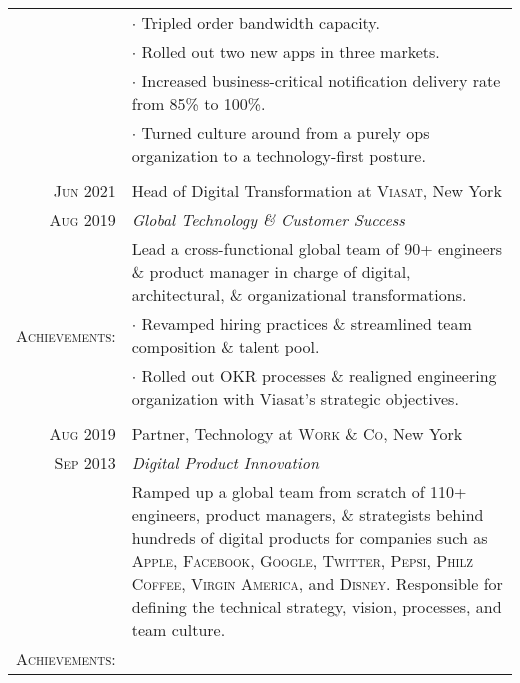 \documentclass[a4paper,10pt]{article}
\begin{document}
\begin{tabular}{r|p{13cm}}
  &$\cdot$ \footnotesize{Tripled order bandwidth capacity.}\\
  &$\cdot$ \footnotesize{Rolled out two new apps in three markets.}\\
  &$\cdot$ \footnotesize{Increased business-critical notification delivery rate from 85\% to 100\%.}\\
  &$\cdot$ \footnotesize{Turned culture around from a purely ops organization to a technology-first posture.}\\

  \multicolumn{2}{c}{}\\

  \textsc{Jun 2021} & Head of Digital Transformation at \textsc{Viasat}, New York \\

  \textsc{Aug 2019} & \emph{Global Technology \& Customer Success}\\

  &\footnotesize{Lead a cross-functional global team of 90+
    engineers \& product manager in charge of digital, architectural,
    \& organizational transformations.}\\

  \textsc{Achievements:}

  &$\cdot$ \footnotesize{Revamped hiring practices \& streamlined team composition \& talent pool.}\\
  &$\cdot$ \footnotesize{Rolled out OKR processes \& realigned engineering organization with Viasat's strategic objectives.}\\

  \multicolumn{2}{c}{}\\

  \textsc{Aug 2019} & Partner, Technology at \textsc{Work \& Co}, New York \\

  \textsc{Sep 2013} & \emph{Digital Product Innovation}\\

  &\footnotesize{Ramped up a global team from scratch of 110+
    engineers, product managers, \& strategists behind hundreds of
    digital products for companies such as \textsc{Apple},
    \textsc{Facebook}, \textsc{Google}, \textsc{Twitter},
    \textsc{Pepsi}, \textsc{Philz Coffee}, \textsc{Virgin America},
    and \textsc{Disney}. Responsible for defining the technical
    strategy, vision, processes, and team culture.}\\

  \textsc{Achievements:}


\end{tabular}
\end{document}
